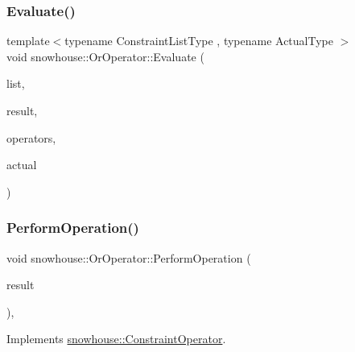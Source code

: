 \subsubsection{\texorpdfstring{Evaluate()}{Evaluate()}}
{\footnotesize\ttfamily template$<$typename Constraint\+List\+Type , typename Actual\+Type $>$ \\
void snowhouse\+::\+Or\+Operator\+::\+Evaluate (\begin{DoxyParamCaption}\item[{Constraint\+List\+Type \&}]{list,  }\item[{\mbox{\hyperlink{namespacesnowhouse_a719169b1315a13161c15f25e600a8f51}{Result\+Stack}} \&}]{result,  }\item[{\mbox{\hyperlink{namespacesnowhouse_adcb10e215e6a4bbcb35722a9c7270fc6}{Operator\+Stack}} \&}]{operators,  }\item[{const Actual\+Type \&}]{actual }\end{DoxyParamCaption})\hspace{0.3cm}{\ttfamily [inline]}}

\mbox{\label{structsnowhouse_1_1OrOperator_abd9c1f7e6b6867e83a0e7b0bbaa75f02}} 
\subsubsection{\texorpdfstring{PerformOperation()}{PerformOperation()}}
{\footnotesize\ttfamily void snowhouse\+::\+Or\+Operator\+::\+Perform\+Operation (\begin{DoxyParamCaption}\item[{\mbox{\hyperlink{namespacesnowhouse_a719169b1315a13161c15f25e600a8f51}{Result\+Stack}} \&}]{result }\end{DoxyParamCaption})\hspace{0.3cm}{\ttfamily [inline]}, {\ttfamily [virtual]}}



Implements \mbox{\hyperlink{structsnowhouse_1_1ConstraintOperator_a885882868139127eb8ff3f3ec6a97737}{snowhouse\+::\+Constraint\+Operator}}.

\mbox{\label{structsnowhouse_1_1OrOperator_af0c0077685e16330a75b0c96f29ed405}} 
